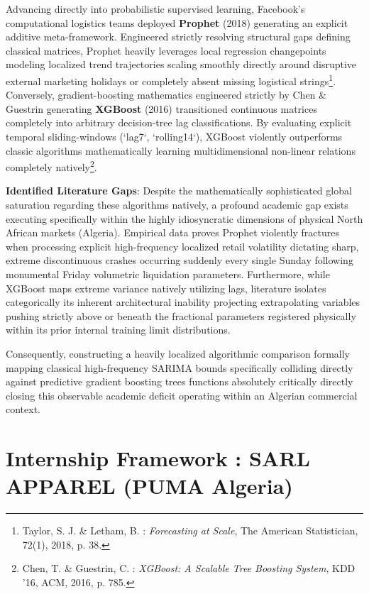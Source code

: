 \documentclass[12pt,a4paper]{report}
\begin{document}
Advancing directly into probabilistic supervised learning, Facebook’s computational logistics teams deployed \textbf{Prophet} (2018) generating an explicit additive meta-framework. Engineered strictly resolving structural gaps defining classical matrices, Prophet heavily leverages local regression changepoints modeling localized trend trajectories scaling smoothly directly around disruptive external marketing holidays or completely absent missing logistical strings\footnote{Taylor, S. J. \& Letham, B. : \textit{Forecasting at Scale}, The American Statistician, 72(1), 2018, p. 38.}.
Conversely, gradient-boosting mathematics engineered strictly by Chen & Guestrin generating \textbf{XGBoost} (2016) transitioned continuous matrices completely into arbitrary decision-tree lag classifications. By evaluating explicit temporal sliding-windows (`lag7`, `rolling14`), XGBoost violently outperforms classic algorithms mathematically learning multidimensional non-linear relations completely natively\footnote{Chen, T. \& Guestrin, C. : \textit{XGBoost: A Scalable Tree Boosting System}, KDD '16, ACM, 2016, p. 785.}.

\textbf{Identified Literature Gaps}: 
Despite the mathematically sophisticated global saturation regarding these algorithms natively, a profound academic gap exists executing specifically within the highly idiosyncratic dimensions of physical North African markets (Algeria). Empirical data proves Prophet violently fractures when processing explicit high-frequency localized retail volatility dictating sharp, extreme discontinuous crashes occurring suddenly every single Sunday following monumental Friday volumetric liquidation parameters. Furthermore, while XGBoost maps extreme variance natively utilizing lags, literature isolates categorically its inherent architectural inability projecting extrapolating variables pushing strictly above or beneath the fractional parameters registered physically within its prior internal training limit distributions. 

Consequently, constructing a heavily localized algorithmic comparison formally mapping classical high-frequency SARIMA bounds specifically colliding directly against predictive gradient boosting trees functions absolutely critically directly closing this observable academic deficit operating within an Algerian commercial context.

\section{Internship Framework : SARL APPAREL (PUMA Algeria)}
\end{document}
